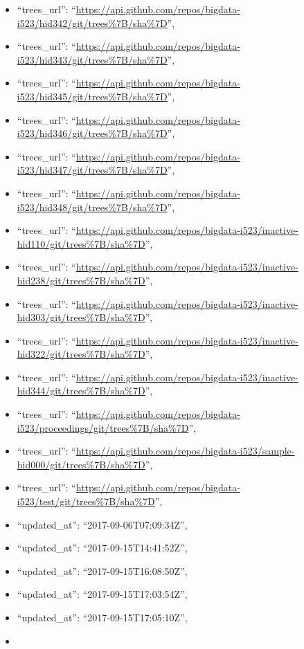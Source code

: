 \begin{itemize}
\item
  ``trees\_url'':
  ``\url{https://api.github.com/repos/bigdata-i523/hid342/git/trees\%7B/sha\%7D}'',
\item
  ``trees\_url'':
  ``\url{https://api.github.com/repos/bigdata-i523/hid343/git/trees\%7B/sha\%7D}'',
\item
  ``trees\_url'':
  ``\url{https://api.github.com/repos/bigdata-i523/hid345/git/trees\%7B/sha\%7D}'',
\item
  ``trees\_url'':
  ``\url{https://api.github.com/repos/bigdata-i523/hid346/git/trees\%7B/sha\%7D}'',
\item
  ``trees\_url'':
  ``\url{https://api.github.com/repos/bigdata-i523/hid347/git/trees\%7B/sha\%7D}'',
\item
  ``trees\_url'':
  ``\url{https://api.github.com/repos/bigdata-i523/hid348/git/trees\%7B/sha\%7D}'',
\item
  ``trees\_url'':
  ``\url{https://api.github.com/repos/bigdata-i523/inactive-hid110/git/trees\%7B/sha\%7D}'',
\item
  ``trees\_url'':
  ``\url{https://api.github.com/repos/bigdata-i523/inactive-hid238/git/trees\%7B/sha\%7D}'',
\item
  ``trees\_url'':
  ``\url{https://api.github.com/repos/bigdata-i523/inactive-hid303/git/trees\%7B/sha\%7D}'',
\item
  ``trees\_url'':
  ``\url{https://api.github.com/repos/bigdata-i523/inactive-hid322/git/trees\%7B/sha\%7D}'',
\item
  ``trees\_url'':
  ``\url{https://api.github.com/repos/bigdata-i523/inactive-hid344/git/trees\%7B/sha\%7D}'',
\item
  ``trees\_url'':
  ``\url{https://api.github.com/repos/bigdata-i523/proceedings/git/trees\%7B/sha\%7D}'',
\item
  ``trees\_url'':
  ``\url{https://api.github.com/repos/bigdata-i523/sample-hid000/git/trees\%7B/sha\%7D}'',
\item
  ``trees\_url'':
  ``\url{https://api.github.com/repos/bigdata-i523/test/git/trees\%7B/sha\%7D}'',
\item
  ``updated\_at'': ``2017-09-06T07:09:34Z'',
\item
  ``updated\_at'': ``2017-09-15T14:41:52Z'',
\item
  ``updated\_at'': ``2017-09-15T16:08:50Z'',
\item
  ``updated\_at'': ``2017-09-15T17:03:54Z'',
\item
  ``updated\_at'': ``2017-09-15T17:05:10Z'',
\item

\end{itemize}
